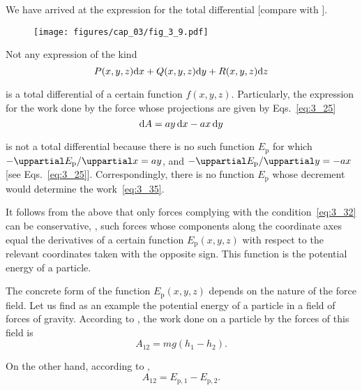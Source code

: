 \noindent
We have arrived at the expression for the total differential [compare with ].

\begin{figure}[t]
	\begin{center}
		\texttt{[image: figures/cap\_03/fig\_3\_9.pdf]}
		\caption[]{}
		\label{fig:3_9}
	\end{center}
	\vspace{-0.7cm}
\end{figure}

Not any expression of the kind
\begin{equation*}
P(x,y,z)\mathrm{d} x + Q(x,y,z)\mathrm{d} y + R(x,y,z)\mathrm{d} z
\end{equation*}

\noindent
is a total differential of a certain function $f(x,y,z)$. Particularly, the expression for the work done by the force whose projections are given by Eqs.~\eqref{eq:3_25}
\begin{equation}\label{eq:3_35}
\mathrm{d} A = ay\,\mathrm{d} x - ax\,\mathrm{d} y
\end{equation}

\noindent
is not a total differential because there is no such function $E_{\text{p}}$ for which $-\diffinpartial{E_{\text{p}}}{x}=ay$, and $-\diffinpartial{E_{\text{p}}}{y}=-ax$ [see Eqs.~\eqref{eq:3_25}]. Correspondingly, there is no function $E_{\text{p}}$ whose decrement would determine the work~\eqref{eq:3_35}.

It follows from the above that only forces complying with the condition~\eqref{eq:3_32} can be conservative, \ie, such forces whose components along the coordinate axes equal the derivatives of a certain function $E_{\text{p}}(x,y,z)$ with respect to the relevant coordinates taken with the opposite sign. This function is the potential energy of a particle.

The concrete form of the function $E_{\text{p}}(x,y,z)$ depends on the nature of the force field. Let us find as an example the potential energy of a particle in a field of forces of gravity. According to , the work done on a particle by the forces of this field is
\begin{equation*}
A_{12} = mg(h_1-h_2).
\end{equation*}

\noindent
On the other hand, according to ,
\begin{equation*}
A_{12} = E_{\text{p},1} - E_{\text{p},2}.
\end{equation*}

